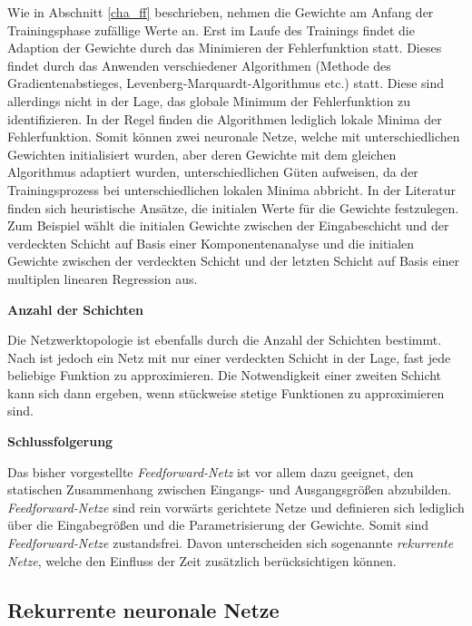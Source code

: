 Wie in Abschnitt \ref{cha_ff} beschrieben, nehmen die Gewichte am Anfang der Trainingsphase zufällige Werte an. Erst im Laufe des Trainings findet die Adaption der Gewichte durch das Minimieren der Fehlerfunktion statt. Dieses findet durch das Anwenden verschiedener Algorithmen (Methode des Gradientenabstieges, Levenberg-Marquardt-Algorithmus etc.) statt. Diese sind allerdings nicht in der Lage, das globale Minimum der Fehlerfunktion zu identifizieren. In der Regel finden die Algorithmen lediglich lokale Minima der Fehlerfunktion. Somit können zwei neuronale Netze, welche mit unterschiedlichen Gewichten initialisiert wurden, aber deren Gewichte mit dem gleichen Algorithmus adaptiert wurden, unterschiedlichen Güten aufweisen, da der Trainingsprozess bei unterschiedlichen lokalen Minima abbricht. In der Literatur finden sich heuristische Ansätze, die initialen Werte für die Gewichte festzulegen. Zum Beispiel wählt \cite{Piovoso.1991b} die initialen Gewichte zwischen der Eingabeschicht und der verdeckten Schicht auf Basis einer Komponentenanalyse und die initialen Gewichte zwischen der verdeckten Schicht und der letzten Schicht auf Basis einer multiplen linearen Regression aus. 

\textbf{Anzahl der Schichten}

Die Netzwerktopologie ist ebenfalls durch die Anzahl der Schichten bestimmt. Nach \cite{Hornik.1989} ist jedoch ein Netz mit nur einer verdeckten Schicht in der Lage, fast jede beliebige Funktion zu approximieren. Die Notwendigkeit einer zweiten Schicht kann sich dann ergeben, wenn stückweise stetige Funktionen zu approximieren sind.

\textbf{Schlussfolgerung}

Das bisher vorgestellte \textit{Feedforward-Netz} ist vor allem dazu geeignet, den statischen Zusammenhang zwischen Eingangs- und Ausgangsgrößen abzubilden. \textit{Feedforward-Netze} sind rein vorwärts gerichtete Netze und definieren sich lediglich über die Eingabegrößen und die Parametrisierung der Gewichte. Somit sind \textit{Feedforward-Netze} zustandsfrei. Davon unterscheiden sich sogenannte \textit{rekurrente Netze}, welche den Einfluss der Zeit zusätzlich berücksichtigen können. 





\subsection{Rekurrente neuronale Netze}


